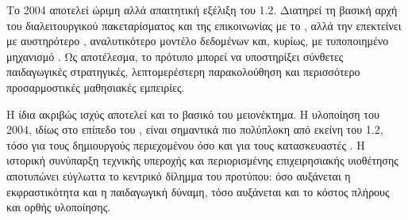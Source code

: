 Το  2004 αποτελεί ώριμη αλλά απαιτητική εξέλιξη του  1.2. Διατηρεί τη βασική αρχή του διαλειτουργικού πακεταρίσματος και της  επικοινωνίας με το , αλλά την επεκτείνει με αυστηρότερο , αναλυτικότερο μοντέλο δεδομένων και, κυρίως, με τυποποιημένο μηχανισμό . Ως αποτέλεσμα, το πρότυπο μπορεί να υποστηρίξει σύνθετες παιδαγωγικές στρατηγικές, λεπτομερέστερη παρακολούθηση και περισσότερο προσαρμοστικές μαθησιακές εμπειρίες.

Η ίδια ακριβώς ισχύς αποτελεί και το βασικό του μειονέκτημα. Η υλοποίηση του  2004, ιδίως στο επίπεδο του , είναι σημαντικά πιο πολύπλοκη από εκείνη του  1.2, τόσο για τους δημιουργούς περιεχομένου όσο και για τους κατασκευαστές . Η ιστορική συνύπαρξη τεχνικής υπεροχής και περιορισμένης επιχειρησιακής υιοθέτησης αποτυπώνει εύγλωττα το κεντρικό δίλημμα του προτύπου: όσο αυξάνεται η εκφραστικότητα και η παιδαγωγική δύναμη, τόσο αυξάνεται και το κόστος πλήρους και ορθής υλοποίησης.
